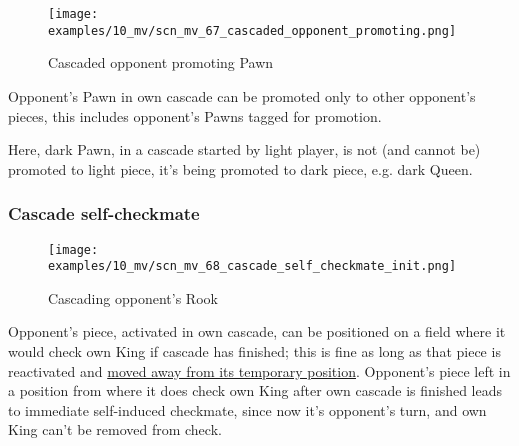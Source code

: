 \clearpage %

\vspace*{-2.1\baselineskip}
\noindent
\begin{figure}[h]
\texttt{[image: examples/10\_mv/scn\_mv\_67\_cascaded\_opponent\_promoting.png]}
\caption{Cascaded opponent promoting Pawn}
\label{fig:scn_mv_67_cascaded_opponent_promoting}
\end{figure}

Opponent's Pawn in own cascade can be promoted only to other opponent's pieces,
this includes opponent's Pawns tagged for promotion.

Here, dark Pawn, in a cascade started by light player, is not (and cannot be)
promoted to light piece, it's being promoted to dark piece, e.g. dark Queen.

\clearpage %

\subsubsection*{Cascade self-checkmate}
\label{sec:Miranda's veil/Wave/Cascading opponent/Cascade self-checkmate}

\vspace*{-1.5\baselineskip}
\noindent
\begin{figure}[h]
\texttt{[image: examples/10\_mv/scn\_mv\_68\_cascade\_self\_checkmate\_init.png]}
\vspace*{-1.4\baselineskip}
\caption{Cascading opponent's Rook}
\label{fig:scn_mv_68_cascade_self_checkmate_init}
\end{figure}

\vspace*{-0.4\baselineskip}
Opponent's piece, activated in own cascade, can be positioned on a field where
it would check own King if cascade has finished; this is fine as long as that piece
is reactivated and
\hyperref[fig:scn_mv_51_cascaded_piece_check_init]{moved away from its temporary position}.
Opponent's piece left in a position from where it does check own King after own cascade
is finished leads to immediate self-induced checkmate, since now it's opponent's turn,
and own King can't be removed from check.

\clearpage %

